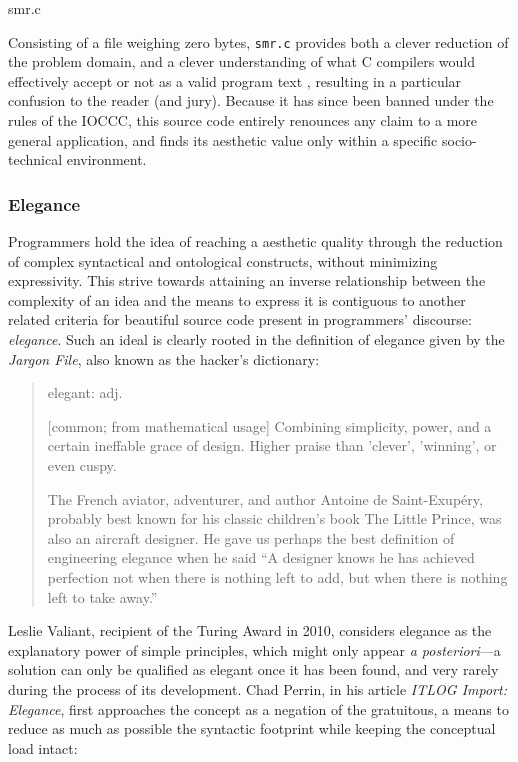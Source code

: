 \begin{listing}
  \inputminted{c}{./corpus/smr.c}
  \caption{smr.c}
  \label{code:smr_c}
\end{listing}

Consisting of a file weighing zero bytes, \lstinline{smr.c} provides both a clever reduction of the problem domain, and a clever understanding of what C compilers would effectively accept or not as a valid program text \citep{kanakarakis_international_2022}, resulting in a particular confusion to the reader (and jury). Because it has since been banned under the rules of the IOCCC, this source code entirely renounces any claim to a more general application, and finds its aesthetic value only within a specific socio-technical environment.

\subsubsection{Elegance}
\label{subsubsec:elegance}

Programmers hold the idea of reaching a aesthetic quality through the reduction of complex syntactical and ontological constructs, without minimizing expressivity. This strive towards attaining an inverse relationship between the complexity of an idea and the means to express it is contiguous to another related criteria for beautiful source code present in programmers' discourse: \emph{elegance}. Such an ideal is clearly rooted in the definition of elegance given by the \emph{Jargon File}, also known as the hacker's dictionary:

\begin{quote}
  elegant: adj.

    [common; from mathematical usage] Combining simplicity, power, and a certain ineffable grace of design. Higher praise than 'clever', 'winning', or even cuspy.

    The French aviator, adventurer, and author Antoine de Saint-Exupéry, probably best known for his classic children's book The Little Prince, was also an aircraft designer. He gave us perhaps the best definition of engineering elegance when he said “A designer knows he has achieved perfection not when there is nothing left to add, but when there is nothing left to take away.” \citep{jargonfile4.4.7_elegant_2003}
\end{quote}

Leslie Valiant, recipient of the Turing Award in 2010, considers elegance as the explanatory power of simple principles, which might only appear \emph{a posteriori}—a solution can only be qualified as elegant once it has been found, and very rarely during the process of its development\citep{anthes_beauty_2011}. Chad Perrin, in his article \emph{ITLOG Import: Elegance}, first approaches the concept as a negation of the gratuitous, a means to reduce as much as possible the syntactic footprint while keeping the conceptual load intact:


